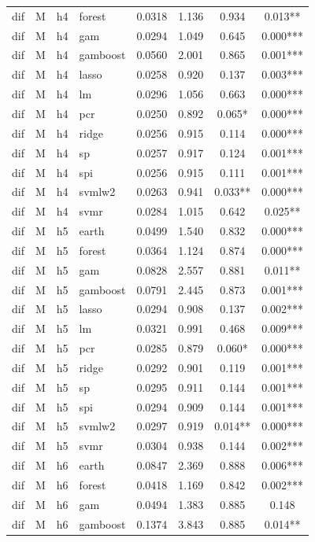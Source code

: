 \begin{ThreePartTable}
\begin{longtable}[t]{llclcccc}
dif & M & h4 & forest & 0.0318 & 1.136 & 0.934 & 0.013**\\
dif & M & h4 & gam & 0.0294 & 1.049 & 0.645 & 0.000***\\
dif & M & h4 & gamboost & 0.0560 & 2.001 & 0.865 & 0.001***\\
dif & M & h4 & lasso & 0.0258 & 0.920 & 0.137 & 0.003***\\
dif & M & h4 & lm & 0.0296 & 1.056 & 0.663 & 0.000***\\
dif & M & h4 & pcr & 0.0250 & 0.892 & 0.065* & 0.000***\\
dif & M & h4 & ridge & 0.0256 & 0.915 & 0.114 & 0.000***\\
dif & M & h4 & sp & 0.0257 & 0.917 & 0.124 & 0.001***\\
dif & M & h4 & spi & 0.0256 & 0.915 & 0.111 & 0.001***\\
dif & M & h4 & svmlw2 & 0.0263 & 0.941 & 0.033** & 0.000***\\
dif & M & h4 & svmr & 0.0284 & 1.015 & 0.642 & 0.025**\\
\addlinespace
dif & M & h5 & earth & 0.0499 & 1.540 & 0.832 & 0.000***\\
dif & M & h5 & forest & 0.0364 & 1.124 & 0.874 & 0.000***\\
dif & M & h5 & gam & 0.0828 & 2.557 & 0.881 & 0.011**\\
dif & M & h5 & gamboost & 0.0791 & 2.445 & 0.873 & 0.001***\\
dif & M & h5 & lasso & 0.0294 & 0.908 & 0.137 & 0.002***\\
dif & M & h5 & lm & 0.0321 & 0.991 & 0.468 & 0.009***\\
dif & M & h5 & pcr & 0.0285 & 0.879 & 0.060* & 0.000***\\
dif & M & h5 & ridge & 0.0292 & 0.901 & 0.119 & 0.001***\\
dif & M & h5 & sp & 0.0295 & 0.911 & 0.144 & 0.001***\\
dif & M & h5 & spi & 0.0294 & 0.909 & 0.144 & 0.001***\\
dif & M & h5 & svmlw2 & 0.0297 & 0.919 & 0.014** & 0.000***\\
dif & M & h5 & svmr & 0.0304 & 0.938 & 0.144 & 0.002***\\
\addlinespace
dif & M & h6 & earth & 0.0847 & 2.369 & 0.888 & 0.006***\\
dif & M & h6 & forest & 0.0418 & 1.169 & 0.842 & 0.002***\\
dif & M & h6 & gam & 0.0494 & 1.383 & 0.885 & 0.148\\
dif & M & h6 & gamboost & 0.1374 & 3.843 & 0.885 & 0.014**\\

\end{longtable}
\end{ThreePartTable}
